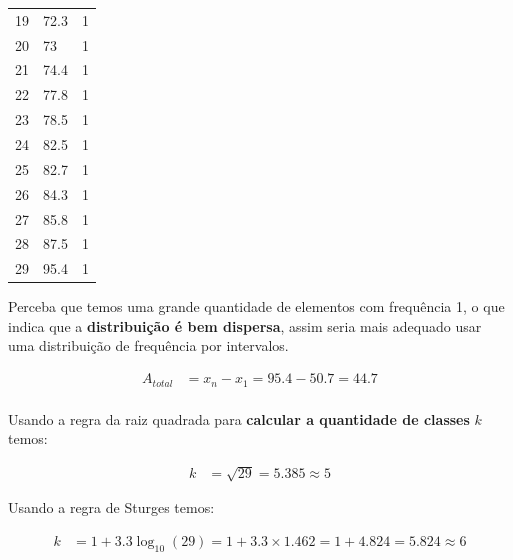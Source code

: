 \begin{parts}
\begin{solution}
\begin{table}[H]
\begin{tabular}{rlr}
                19 & 72.3   & 1    \\
                20 & 73     & 1    \\
                21 & 74.4   & 1    \\
                22 & 77.8   & 1    \\
                23 & 78.5   & 1    \\
                24 & 82.5   & 1    \\
                25 & 82.7   & 1    \\
                26 & 84.3   & 1    \\
                27 & 85.8   & 1    \\
                28 & 87.5   & 1    \\
                29 & 95.4   & 1    \\
                \hline
            \end{tabular}
        \end{table}

        Perceba que temos uma grande quantidade de elementos com frequência 1, o que indica que a \textbf{distribuição é bem dispersa}, assim seria mais adequado usar uma distribuição de frequência por intervalos.

        \begin{equation*}
            \begin{split}
                A_{total} & = x_n - x_1 = 95.4 - 50.7 = 44.7 \\
            \end{split}
        \end{equation*}

        Usando a regra da raiz quadrada para \textbf{calcular a quantidade de classes} $k$ temos:

        \begin{equation*}
            \begin{split}
                k & = \sqrt{29} = 5.385 \approx 5
            \end{split}
        \end{equation*}

        Usando a regra de Sturges temos:

        \begin{equation*}
            \begin{split}
                k & = 1 + 3.3 \log_{10}(29) = 1 + 3.3 \times 1.462 = 1 + 4.824 = 5.824 \approx 6 \\
            \end{split}
        \end{equation*}


\end{solution}
\end{parts}
